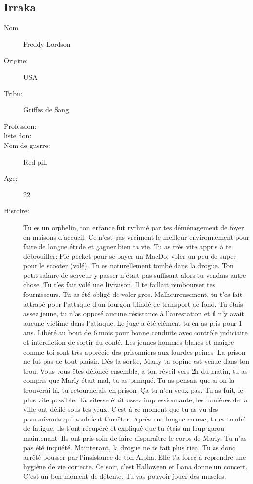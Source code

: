 \documentclass[oneside,12pt]{book}
\begin{document}
\begin{flushleft}
\section{Irraka}
\begin{description}
\item[Nom:]{Freddy Lordson}
\item[Origine:]{USA}
\item[Tribu:]{Griffes de Sang}
\item[Profession:]{}
\item[liste don:]{}
\item[Nom de guerre:]{Red pill}
\item[Age:]{22}
\item[Histoire:]{ 
    Tu es un orphelin, ton enfance fut rythmé par tes déménagement de foyer en maisons d'accueil. Ce n'est pas vraiment le meilleur environnement pour faire de longue étude et gagner bien ta vie. Tu as très vite appris à te débrouiller: Pic-pocket pour se payer un MacDo, voler un peu de super pour le scooter (volé). 
    Tu es naturellement tombé dans la drogue. Ton petit salaire de serveur y passer n'était pas suffisant alors tu vendais autre chose. Tu t'es fait volé une livraison. Il te faillait rembourser tes fournisseurs. Tu as été obligé de voler gros. 
    Malheureusement, tu t'es fait attrapé pour l'attaque d'un fourgon blindé de transport de fond. Tu étais assez jeune, tu n'as opposé aucune résistance à l'arrestation et il n'y avait aucune victime dans l'attaque. 
    Le juge a été clément tu en as pris pour 1 ans. Libéré au bout de 6 mois pour bonne conduite avec contrôle judiciaire et interdiction de sortir du conté. 
    Les jeunes hommes blancs et maigre comme toi sont très apprécie des prisonniers aux lourdes peines. 
    La prison ne fut pas de tout plaisir.  Dès ta sortie, Marly ta copine est venue dans ton trou. 
    Vous vous êtes défoncé ensemble, a ton réveil vers 2h du matin, tu as compris que Marly était mal, tu as paniqué.
    Tu as pensais que si on la trouverai là, tu retournerais en prison. 
    Ça tu n'en veux pas. Tu as fuit, le plus vite possible. 
    Ta vitesse était assez impressionnante, les lumières de la ville ont défilé sous tes yeux. 
    C'est à ce moment que tu as vu des poursuivants qui voulaient t'arrêter. 
    Après une longue course, tu es tombé de fatigue. 
    Ils t'ont récupéré et expliqué que tu étais un loup garou maintenant. 
    Ils ont pris soin de faire disparaître le corps de Marly. 
    Tu n'as pas été inquiété. 
    Maintenant, la drogue ne te fait plus rien. 
    Tu as donc arrêté pousser par l'insistance de ton Alpha. 
    Elle t'a forcé à reprendre une hygiène de vie correcte. 
    Ce soir, c'est Halloween et Lana donne un concert. 
    C'est un bon moment de détente. 
    Tu vas pouvoir jouer des muscles. 

}
\end{description}
\end{flushleft}
\end{document}
